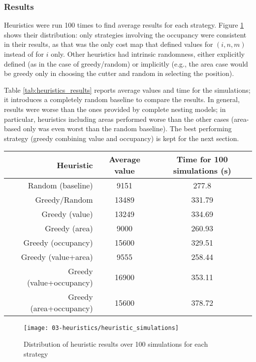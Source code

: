 \subsubsection{Results}
Heuristics were run 100 times to find average results for each strategy. Figure \ref{fig:heuristics_results} shows their distribution: only strategies involving the occupancy were consistent in their results, as that was the only cost map that defined values for $(i, n, m)$ instead of for $i$ only. Other heuristics had intrinsic randomness, either explicitly defined (as in the case of greedy/random) or implicitly (e.g., the area case would be greedy only in choosing the cutter and random in selecting the position).

Table \ref{tab:heuristics_results} reports average values and time for the simulations; it introduces a completely random baseline to compare the results. In general, results were worse than the ones provided by complete nesting models; in particular, heuristics including areas performed worse than the other cases (area-based only was even worst than the random baseline). The best performing strategy (greedy combining value and occupancy) is kept for the next section.

\begin{center}
	\begin{tabular}{r|c|c}
		Heuristic					& Average value	& Time for 100 simulations (s) 	\\
		\hline
		Random (baseline) 			& 9151 			& 277.8 						\\
		Greedy/Random 				& 13489 		& 331.79 						\\
		Greedy (value) 				& 13249			& 334.69 						\\
		Greedy (area) 				& 9000 			& 260.93						\\
		Greedy (occupancy) 			& 15600			& 329.51						\\
		Greedy (value+area) 		& 9555			& 258.44						\\
		Greedy (value+occupancy)	& 16900			& 353.11						\\
		Greedy (area+occupancy)		& 15600			& 378.72						\\
	\end{tabular}
\end{center}

\begin{figure}[H]
	\centering	
	\texttt{[image: 03-heuristics/heuristic\_simulations]}
	\caption{Distribution of heuristic results over 100 simulations for each strategy}
	\label{fig:heuristics_results}
\end{figure}


